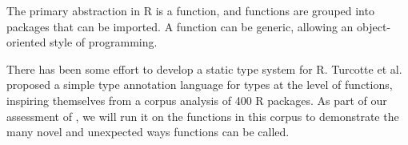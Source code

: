 \documentclass[sigplan,anonymous,review]{acmart}
\begin{document}
\begin{compactitem}[$-$]


\end{compactitem}



The primary abstraction in R is a function, and functions are grouped into packages that can be imported. 
A function can be generic, allowing an object-oriented style of programming. 

There has been some effort to develop a static type system for R.
Turcotte et al.~\cite{turcotte2020designing} proposed a simple type annotation language for types at the level of functions, inspiring themselves from a corpus analysis of 400 R packages.
As part of our assessment of \tool, we will run it on the functions in this corpus to demonstrate the many novel and unexpected ways functions can be called.



\end{document}
